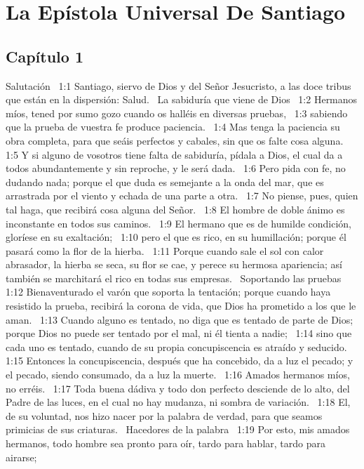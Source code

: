 \chapter{La Epístola Universal De Santiago}


\section*{Capítulo 1 }
Salutación  
1:1 Santiago, siervo de Dios y del Señor Jesucristo, a las doce tribus que están en la dispersión: Salud.  
La sabiduría que viene de Dios  
1:2 Hermanos míos, tened por sumo gozo cuando os halléis en diversas pruebas,  
1:3 sabiendo que la prueba de vuestra fe produce paciencia.  
1:4 Mas tenga la paciencia su obra completa, para que seáis perfectos y cabales, sin que os falte cosa alguna.  
1:5 Y si alguno de vosotros tiene falta de sabiduría, pídala a Dios, el cual da a todos abundantemente y sin reproche, y le será dada.  
1:6 Pero pida con fe, no dudando nada; porque el que duda es semejante a la onda del mar, que es arrastrada por el viento y echada de una parte a otra.  
1:7 No piense, pues, quien tal haga, que recibirá cosa alguna del Señor.  
1:8 El hombre de doble ánimo es inconstante en todos sus caminos.  
1:9 El hermano que es de humilde condición, gloríese en su exaltación;  
1:10 pero el que es rico, en su humillación; porque él pasará como la flor de la hierba.  
1:11 Porque cuando sale el sol con calor abrasador, la hierba se seca, su flor se cae, y perece su hermosa apariencia; así también se marchitará el rico en todas sus empresas.  
Soportando las pruebas  
1:12 Bienaventurado el varón que soporta la tentación; porque cuando haya resistido la prueba, recibirá la corona de vida, que Dios ha prometido a los que le aman.  
1:13 Cuando alguno es tentado, no diga que es tentado de parte de Dios; porque Dios no puede ser tentado por el mal, ni él tienta a nadie;  
1:14 sino que cada uno es tentado, cuando de su propia concupiscencia es atraído y seducido. 
1:15 Entonces la concupiscencia, después que ha concebido, da a luz el pecado; y el pecado, siendo consumado, da a luz la muerte.  
1:16 Amados hermanos míos, no erréis.  
1:17 Toda buena dádiva y todo don perfecto desciende de lo alto, del Padre de las luces, en el cual no hay mudanza, ni sombra de variación.  
1:18 El, de su voluntad, nos hizo nacer por la palabra de verdad, para que seamos primicias de sus criaturas.  
Hacedores de la palabra  
1:19 Por esto, mis amados hermanos, todo hombre sea pronto para oír, tardo para hablar, tardo para airarse;  
